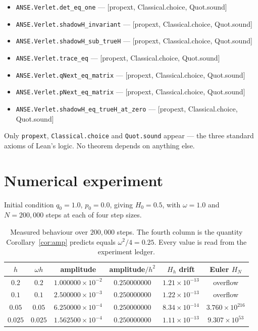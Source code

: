 \documentclass[11pt,a4paper]{article}
\begin{document}
\begin{itemize}\footnotesize
    \item \texttt{ANSE.Verlet.det\_eq\_one} --- [propext, Classical.choice, Quot.sound]
    \item \texttt{ANSE.Verlet.shadowH\_invariant} --- [propext, Classical.choice, Quot.sound]
    \item \texttt{ANSE.Verlet.shadowH\_sub\_trueH} --- [propext, Classical.choice, Quot.sound]
    \item \texttt{ANSE.Verlet.trace\_eq} --- [propext, Classical.choice, Quot.sound]
    \item \texttt{ANSE.Verlet.qNext\_eq\_matrix} --- [propext, Classical.choice, Quot.sound]
    \item \texttt{ANSE.Verlet.pNext\_eq\_matrix} --- [propext, Classical.choice, Quot.sound]
    \item \texttt{ANSE.Verlet.shadowH\_eq\_trueH\_at\_zero} --- [propext, Classical.choice, Quot.sound]
\end{itemize}

Only \texttt{propext}, \texttt{Classical.choice} and \texttt{Quot.sound} appear --- the
three standard axioms of Lean's logic. No theorem depends on anything else.

\section{Numerical experiment}

Initial condition $q_0=1.0$,
$p_0=0.0$, giving
$H_0=0.5$, with $\omega=1.0$ and
$N=200,000$ steps at each of four step sizes.

\begin{table}[h]\centering\small
  \caption{Measured behaviour over $200,000$ steps. The fourth column is the
  quantity Corollary~\ref{cor:amp} predicts equals $\omega^2/4=0.25$.
  Every value is read from the experiment ledger.}
  \begin{tabular}{cccccc}
    \toprule
    $h$ & $\omega h$ & amplitude & amplitude$/h^2$ & $H_h$ drift & Euler $H_N$ \\
    \midrule
    $0.2$ & $0.2$ & $1.000000\times 10^{-2}$ & $0.250000000$ & $1.21\times 10^{-13}$ & overflow \\
    $0.1$ & $0.1$ & $2.500000\times 10^{-3}$ & $0.250000000$ & $1.22\times 10^{-13}$ & overflow \\
    $0.05$ & $0.05$ & $6.250000\times 10^{-4}$ & $0.250000000$ & $8.34\times 10^{-14}$ & $3.760\times 10^{216}$ \\
    $0.025$ & $0.025$ & $1.562500\times 10^{-4}$ & $0.250000000$ & $1.11\times 10^{-13}$ & $9.307\times 10^{53}$ \\
    \bottomrule
  \end{tabular}
\end{table}
\end{document}
